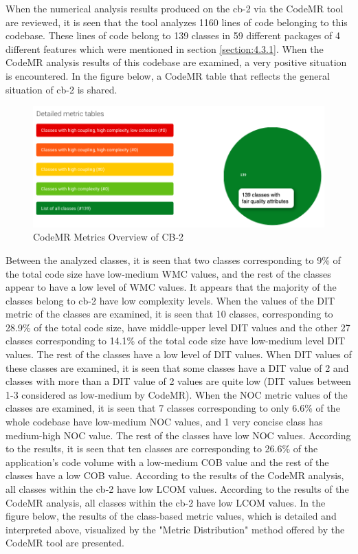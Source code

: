 When the numerical analysis results produced on the cb-2 via the CodeMR tool are reviewed, it is seen that the tool analyzes 1160 lines of code belonging to this codebase. These lines of code belong to 139 classes in 59 different packages of 4 different features which were mentioned in section \ref{section:4.3.1}. When the CodeMR analysis results of this codebase are examined, a very positive situation is encountered. In the figure below, a CodeMR table that reflects the general situation of cb-2 is shared.
\begin{figure}[ht!]
    \centering
    \includegraphics[scale=0.45]{figures/cb-2-metric-table.png}
    \caption{CodeMR Metrics Overview of CB-2}
    \label{fig:cb-2-metric-table.png}
\end{figure}
\FloatBarrier

Between the analyzed classes, it is seen that two classes corresponding to 9\% of the total code size have low-medium WMC values, and the rest of the classes appear to have a low level of WMC values. It appears that the majority of the classes belong to cb-2 have low complexity levels. When the values of the DIT metric of the classes are examined, it is seen that 10 classes, corresponding to 28.9\% of the total code size, have middle-upper level DIT values and the other 27 classes corresponding to 14.1\% of the total code size have low-medium level DIT values. The rest of the classes have a low level of DIT values.  When DIT values of these classes are examined, it is seen that some classes have a DIT value of 2 and classes with more than a DIT value of 2 values are quite low (DIT values between 1-3 considered as low-medium by CodeMR). When the NOC metric values of the classes are examined, it is seen that 7 classes corresponding to only 6.6\% of the whole codebase have low-medium NOC values, and 1 very concise class has medium-high NOC value. The rest of the classes have low NOC values. According to the results, it is seen that ten classes are corresponding to 26.6\% of the application's code volume with a low-medium COB value and the rest of the classes have a low COB value. According to the results of the CodeMR analysis, all classes within the cb-2 have low LCOM values. According to the results of the CodeMR analysis, all classes within the cb-2 have low LCOM values. In the figure below, the results of the class-based metric values, which is detailed and interpreted above, visualized by the "Metric Distribution" method offered by the CodeMR tool are presented.

